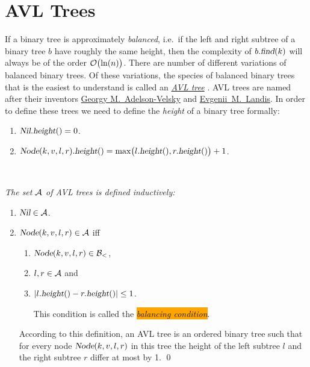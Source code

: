 \section{AVL Trees}
If a binary tree is approximately \emph{balanced}, i.e.~if the left and right subtree of a binary tree $b$  have
roughly the same height, then the complexity of $b.\textsl{find}(k)$ will always be of the order
$\mathcal{O}\bigl(\ln(n)\bigr)$.  There are number of different variations of
balanced binary trees.  Of these variations, the species of balanced binary trees that is the easiest to understand is
called an \href{https://en.wikipedia.org/wiki/AVL_tree}{\emph{AVL tree}} \cite{adelson:62}.  AVL trees are 
named after their inventors \href{https://en.wikipedia.org/wiki/Georgy_Adelson-Velsky}{Georgy M.~Adelson-Velsky} 
and \href{https://en.wikipedia.org/wiki/Evgenii_Landis}{Evgenii~M.~Landis}.  In order to define these 
trees we need to define the \emph{height} of a binary tree formally:
\begin{enumerate}
\item $\textsl{Nil}.\textsl{height}() = 0$.
\item $\textsl{Node}(k,v,l,r).\textsl{height}() = 
       \max\bigl( l.\textsl{height}(), r.\textsl{height}() \bigr) + 1$. \eox
\end{enumerate}

\begin{Definition} \hspace*{\fill} \\
{\em 
  The set $\mathcal{A}$ of \emph{AVL trees} is defined inductively:
  \begin{enumerate}
  \item $\textsl{Nil} \in \mathcal{A}$.
  \item $\textsl{Node}(k,v,l,r) \in \mathcal{A}$ \quad iff 
        \begin{enumerate}
        \item $\textsl{Node}(k,v,l,r) \in \mathcal{B}_<$,
        \item $l, r \in \mathcal{A}$ \quad and
        \item $|l.\textsl{height}() - r.\textsl{height}()| \leq 1$.

              This condition is called the \colorbox{orange}{\emph{balancing condition}}.
        \end{enumerate}
        According to this definition, an AVL tree is an ordered binary tree such that for every node
        $\textsl{Node}(k,v,l,r)$ in this tree the height of the left subtree $l$ and the right
        subtree  $r$ differ at most by 1.  \qed
  \end{enumerate}
}  
\end{Definition}

